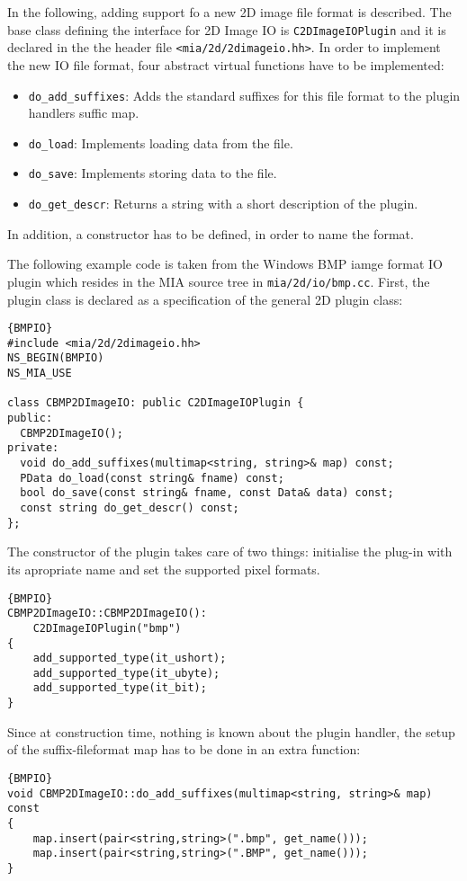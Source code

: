 \documentclass[english, 10pt, a4paper,headsepline,openany]{scrbook}
\begin{document}
In the following, adding support fo a new 2D image file format is described. 
The base class defining the interface for 2D Image IO is \texttt{C2DImageIOPlugin} and it is 
  declared in the the header file \texttt{<mia/2d/2dimageio.hh>}. 
In order to implement the new IO file format, four abstract virtual functions have to be implemented: 
\begin{itemize}  
\item {\tt do\_add\_suffixes}: Adds the standard suffixes for this file format to the plugin handlers suffic map. 
\item {\tt do\_load}: Implements loading data from the file. 
\item {\tt do\_save}: Implements storing data to the file. 
\item {\tt do\_get\_descr}: Returns a string with a short description of the plugin.
\end{itemize}  
In addition, a constructor has to be defined, in order to name the format. 

The following example code is taken from the Windows BMP iamge format IO plugin which resides in the MIA source tree in \texttt{mia/2d/io/bmp.cc}.
First, the plugin class is declared as a specification of the general 2D plugin class: 

\begin{lstlisting}{BMPIO}
#include <mia/2d/2dimageio.hh>
NS_BEGIN(BMPIO)
NS_MIA_USE

class CBMP2DImageIO: public C2DImageIOPlugin {
public:
  CBMP2DImageIO();
private: 
  void do_add_suffixes(multimap<string, string>& map) const;
  PData do_load(const string& fname) const;
  bool do_save(const string& fname, const Data& data) const;
  const string do_get_descr() const; 
};
\end{lstlisting}

\noindent 
The constructor of the plugin takes care of two things: initialise the plug-in with its apropriate name and set the supported pixel formats. 

\begin{lstlisting}{BMPIO}
CBMP2DImageIO::CBMP2DImageIO():
	C2DImageIOPlugin("bmp")
{
	add_supported_type(it_ushort);
	add_supported_type(it_ubyte); 
	add_supported_type(it_bit);
}
\end{lstlisting}

\noindent 
Since at construction time, nothing is known about the plugin handler, the setup of the suffix-fileformat map has to be done in an extra function: 
\begin{lstlisting}{BMPIO}
void CBMP2DImageIO::do_add_suffixes(multimap<string, string>& map) const
{
	map.insert(pair<string,string>(".bmp", get_name())); 
	map.insert(pair<string,string>(".BMP", get_name())); 
}
\end{lstlisting}
\end{document}

